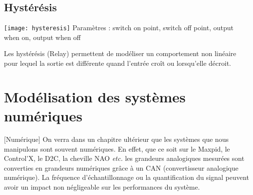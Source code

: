 \subsection{Hystérésis}

\begin{marginfigure}
\centering
\texttt{[image: hysteresis]}
Paramètres : switch on point, switch off point, output when on, output when off
\end{marginfigure}

\begin{marginfigure}
\centering
{}
\end{marginfigure}

Les hystérésis (Relay) permettent de modéliser un comportement non linéaire pour lequel la sortie est différente quand l'entrée croît ou lorsqu'elle décroit. 


\section{Modélisation des systèmes numériques}[Numérique]
On verra dans un chapitre ultérieur que les systèmes que nous manipulons sont souvent numériques. En effet, que ce soit sur le Maxpid, le Control'X, le D2C, la cheville NAO \textit{etc.} les grandeurs analogiques mesurées sont converties en grandeurs numériques grâce à un CAN (convertisseur analogique numérique). La fréquence d'échantillonnage ou la quantification du signal peuvent avoir un impact non négligeable sur les performances du système.



%

